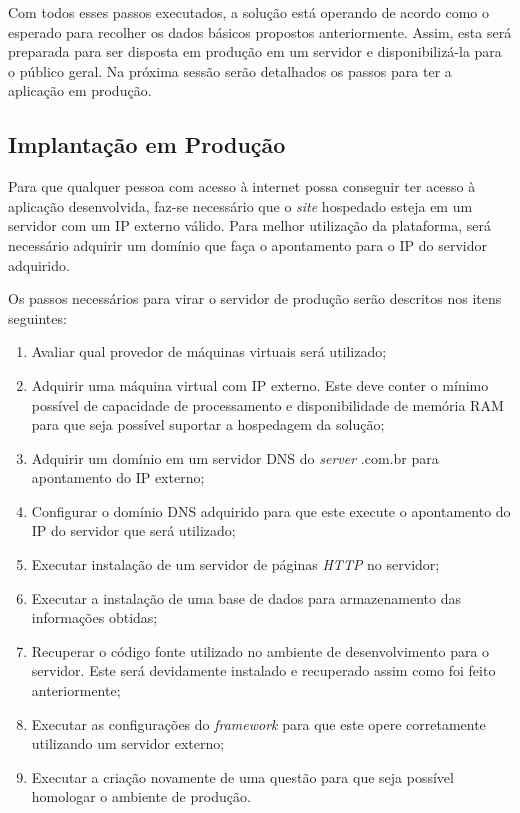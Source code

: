 Com todos esses passos executados, a solução está operando de acordo como o esperado para recolher os dados básicos propostos anteriormente.
Assim, esta será preparada para ser disposta em produção em um servidor e disponibilizá-la para o público geral. Na próxima sessão serão
detalhados os passos para ter a aplicação em produção.

\subsection{Implantação em  Produção}
\label{sub:definir_tecnologia}
Para que qualquer pessoa com acesso à internet possa conseguir ter acesso à aplicação desenvolvida, faz-se necessário que
o \textit{site} hospedado esteja em um servidor com um IP externo válido. Para melhor utilização da plataforma, será necessário adquirir um domínio
que faça o apontamento para o IP do servidor adquirido. 

Os passos necessários para virar o servidor de produção serão descritos nos itens seguintes:

\begin{enumerate}
    \item Avaliar qual provedor de máquinas virtuais será utilizado;
    \item Adquirir uma máquina virtual com IP externo. Este deve conter o mínimo possível de capacidade de processamento e
        disponibilidade de memória RAM para que seja possível suportar a hospedagem da solução;
    \item Adquirir um domínio em um servidor DNS do \textit{server} .com.br para apontamento do IP externo;
    \item Configurar o domínio DNS adquirido para que este execute o apontamento do IP do servidor que será utilizado;
    \item Executar instalação de um servidor de páginas \textit{HTTP} no servidor;
    \item Executar a instalação de uma base de dados para armazenamento das informações obtidas;
    \item Recuperar o código fonte utilizado no ambiente de desenvolvimento para o servidor. Este será devidamente
        instalado e recuperado assim como foi feito anteriormente;
    \item Executar as configurações do \textit{framework} para que este opere corretamente utilizando um servidor externo;
    \item Executar a criação novamente de uma questão para que seja possível homologar o ambiente de produção.
\end{enumerate}

